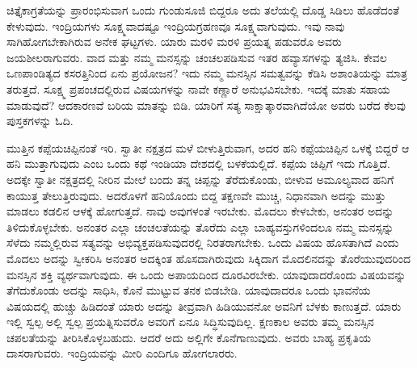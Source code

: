 ಚಿತ್ತೈಕಾಗ್ರತೆಯನ್ನು ಪ್ರಾರಂಭಿಸುವಾಗ ಒಂದು ಗುಂಡುಸೂಜಿ ಬಿದ್ದರೂ ಅದು ತಲೆಯಲ್ಲಿ ದೊಡ್ಡ ಸಿಡಿಲು ಹೊಡೆದಂತೆ ಕೇಳುವುದು. ಇಂದ್ರಿಯಗಳು ಸೂಕ್ಷ್ಮವಾದಷ್ಟೂ ಇಂದ್ರಿಯಗ್ರಹಣವೂ ಸೂಕ್ಷ್ಮವಾಗುವುದು. ಇವು ನಾವು ಸಾಗಿಹೋಗಬೇಕಾಗಿರುವ ಅನೇಕ ಘಟ್ಟಗಳು. ಯಾರು ಮರಳಿ ಮರಳಿ ಪ್ರಯತ್ನ ಪಡುವರೊ ಅವರು ಜಯಶೀಲರಾಗುವರು. ವಾದ ಮತ್ತು ನಮ್ಮ ಮನಸ್ಸನ್ನು ಚಂಚಲಪಡಿಸುವ ಇತರ ಹವ್ಯಾಸಗಳನ್ನು ತ್ಯಜಿಸಿ. ಕೇವಲ ಒಣಪಾಂಡಿತ್ಯದ ಕಸರತ್ತಿನಿಂದ ಏನು ಪ್ರಯೋಜನ? ಇದು ನಮ್ಮ ಮನಸ್ಸಿನ ಸಮತ್ವವನ್ನು ಕೆಡಿಸಿ ಅಶಾಂತಿಯನ್ನು ಮಾತ್ರ ತರುತ್ತದೆ. ಸೂಕ್ಷ್ಮ ಪ್ರಪಂಚದಲ್ಲಿರುವ ವಿಷಯಗಳನ್ನು ನಾವೇ ಕಣ್ಣಾರೆ ಅನುಭವಿಸಬೇಕು. ಇದಕ್ಕೆ ಮಾತು ಸಹಾಯ ಮಾಡುವುದೆ? ಆದಕಾರಣವೆ ಬರಿಯ ಮಾತನ್ನು ಬಿಡಿ. ಯಾರಿಗೆ ಸತ್ಯ ಸಾಕ್ಷಾತ್ಕಾರವಾಗಿದೆಯೋ ಅವರು ಬರೆದ ಕೆಲವು ಪುಸ್ತಕಗಳನ್ನು ಓದಿ. 

ಮುತ್ತಿನ ಕಪ್ಪೆಯಚಿಪ್ಪಿನಂತೆ ಇರಿ. ಸ್ವಾತೀ ನಕ್ಷತ್ರದ ಮಳೆ ಬೀಳುತ್ತಿರುವಾಗ, ಅದರ ಹನಿ ಕಪ್ಪೆಯಚಿಪ್ಪಿನ ಒಳಕ್ಕೆ ಬಿದ್ದರೆ ಆ ಹನಿ ಮುತ್ತಾಗುವುದು ಎಂಬ ಒಂದು ಕಥೆ ಇಂಡಿಯಾ ದೇಶದಲ್ಲಿ ಬಳಕೆಯಲ್ಲಿದೆ. ಕಪ್ಪೆಯ ಚಿಪ್ಪಿಗೆ ಇದು ಗೊತ್ತಿದೆ. ಅದಕ್ಕೇ ಸ್ವಾತೀ ನಕ್ಷತ್ರದಲ್ಲಿ ನೀರಿನ ಮೇಲೆ ಬಂದು ತನ್ನ ಚಿಪ್ಪನ್ನು ತೆರೆದುಕೊಂಡು, ಬೀಳುವ ಅಮೂಲ್ಯವಾದ ಹನಿಗೆ ಕಾಯುತ್ತ ತೇಲುತ್ತಿರುವುದು. ಅದರೊಳಗೆ ಹನಿಯೊಂದು ಬಿದ್ದ ತಕ್ಷಣವೇ ಮುಚ್ಚಿ, ನಿಧಾನವಾಗಿ ಅದನ್ನು ಮುತ್ತು ಮಾಡಲು ಕಡಲಿನ ಆಳಕ್ಕೆ ಹೋಗುತ್ತದೆ. ನಾವು ಅವುಗಳಂತೆ ಇರಬೇಕು. ಮೊದಲು ಕೇಳಬೇಕು, ಅನಂತರ ಅದನ್ನು ತಿಳಿದುಕೊಳ್ಳಬೇಕು. ಅನಂತರ ಎಲ್ಲಾ ಚಂಚಲತೆಯನ್ನು ತೊರೆದು ಎಲ್ಲಾ ಬಾಹ್ಯವಸ್ತುಗಳಿಂದಲೂ ನಮ್ಮ ಮನಸ್ಸನ್ನು ಸೆಳೆದು ನಮ್ಮಲ್ಲಿರುವ ಸತ್ಯವನ್ನು ಅಭಿವ್ಯಕ್ತಪಡಿಸುವುದರಲ್ಲಿ ನಿರತರಾಗಬೇಕು. ಒಂದು ವಿಷಯ ಹೊಸತಾಗಿದೆ ಎಂದು ಮೊದಲು ಅದನ್ನು ಸ್ವೀಕರಿಸಿ ಅನಂತರ ಅದಕ್ಕಿಂತ ಹೊಸದಾಗಿರುವುದು ಸಿಕ್ಕಿದಾಗ ಮೊದಲಿನದನ್ನು ತೊರೆಯುವುದರಿಂದ ಮನಸ್ಸಿನ ಶಕ್ತಿ ವ್ಯರ್ಥವಾಗುವುದು. ಈ ಒಂದು ಅಪಾಯದಿಂದ ದೂರವಿರಬೇಕು. ಯಾವುದಾದರೊಂದು ವಿಷಯವನ್ನು ತೆಗೆದುಕೊಂಡು ಅದನ್ನು ಸಾಧಿಸಿ, ಕೊನೆ ಮುಟ್ಟುವ ತನಕ ಬಿಡಬೇಡಿ. ಯಾವುದಾದರೂ ಒಂದು ಭಾವನೆಯ ವಿಷಯದಲ್ಲಿ ಹುಚ್ಚು ಹಿಡಿದಂತೆ ಯಾರು ಅದನ್ನು ತೀವ್ರವಾಗಿ ಹಿಡಿಯುವನೋ ಅವನಿಗೆ ಬೆಳಕು ಕಾಣುತ್ತದೆ. ಯಾರು ಇಲ್ಲಿ ಸ್ವಲ್ಪ ಅಲ್ಲಿ ಸ್ವಲ್ಪ ಪ್ರಯತ್ನಿಸುವರೊ ಅವರಿಗೆ ಏನೂ ಸಿದ್ಧಿಸುವುದಿಲ್ಲ. ಕ್ಷಣಕಾಲ ಅವರು ತಮ್ಮ ಮನಸ್ಸಿನ ಚಪಲತೆಯನ್ನು ತೀರಿಸಿಕೊಳ್ಳಬಹುದು. ಆದರೆ ಅದು ಅಲ್ಲಿಗೇ ಕೊನೆಗಾಣುವುದು. ಅವರು ಬಾಹ್ಯ ಪ್ರಕೃತಿಯ ದಾಸರಾಗುವರು. ಇಂದ್ರಿಯವನ್ನು ಮೀರಿ ಎಂದಿಗೂ ಹೋಗಲಾರರು. 

